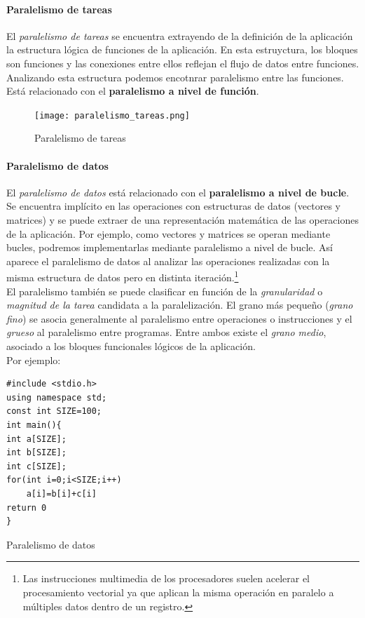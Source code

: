 \documentclass[12pt,spanish]{article}
\begin{document}
\paragraph{Paralelismo de tareas}

El \emph{paralelismo de tareas} se encuentra extrayendo de la definición de la aplicación la estructura lógica de funciones de la aplicación. En esta estruyctura, los bloques son funciones y las conexiones entre ellos reflejan el flujo de datos entre funciones. Analizando esta estructura podemos encotnrar paralelismo entre las funciones.\\
Está relacionado con el \textbf{paralelismo a nivel de función}.
\begin{figure}[H]
\centering
\texttt{[image: paralelismo\_tareas.png]}
\caption{Paralelismo de tareas}
\end{figure}

\paragraph{Paralelismo de datos}

El \emph{paralelismo de datos} está relacionado con el \textbf{paralelismo a nivel de bucle}. Se encuentra implícito en las operaciones con estructuras de datos (vectores y matrices) y se puede extraer de una representación matemática de las operaciones de la aplicación. Por ejemplo, como vectores y matrices se operan mediante bucles, podremos implementarlas mediante paralelismo a nivel de bucle. Así aparece el paralelismo de datos al analizar las operaciones realizadas con la misma estructura de datos pero en distinta iteración.\footnote{Las instrucciones multimedia de los procesadores suelen acelerar el procesamiento vectorial ya que aplican la misma operación en paralelo a múltiples datos dentro de un registro.}\\
El paralelismo también se puede clasificar en función de la \emph{granularidad} o \emph{magnitud de la tarea} candidata a la paralelización. El grano más pequeño (\textit{grano fino}) se asocia generalmente al paralelismo entre operaciones o instrucciones y el \textit{grueso} al paralelismo entre programas. Entre ambos existe el \textit{grano medio}, asociado a los bloques funcionales lógicos de la aplicación.\\
Por ejemplo:
\begin{listing}[H]
\begin{verbatim}
#include <stdio.h>
using namespace std;
const int SIZE=100;
int main(){
int a[SIZE];
int b[SIZE];
int c[SIZE];
for(int i=0;i<SIZE;i++)
	a[i]=b[i]+c[i]
return 0
}
\end{verbatim}
\caption{Paralelismo de datos}
\end{listing}
\end{document}
